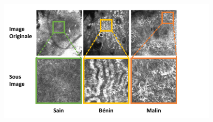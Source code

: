 \documentclass{gretsi}
\begin{document}
\begin{sloppypar}
\begin{figure}[h]
    \begin{center} 
        \includegraphics[width=0.9\linewidth]{content/figures/Donnees.pdf}
        \label{donnees}
    \end{center} 
\end{figure}


\end{sloppypar}
\end{document}
